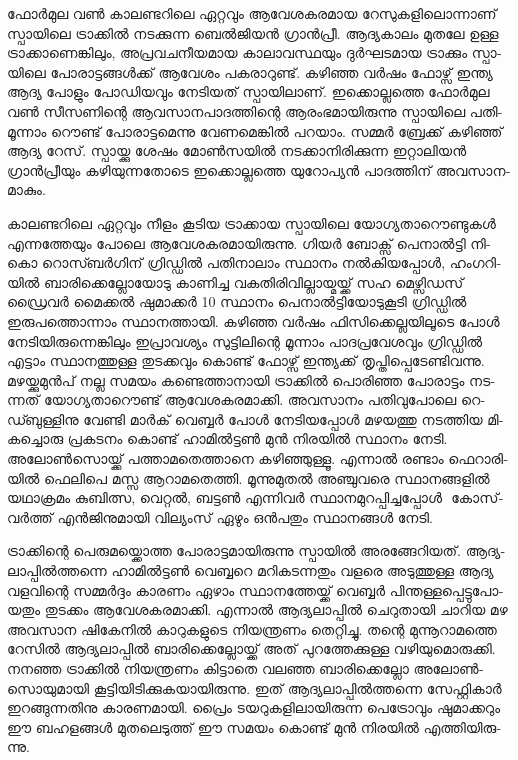 \vskip 2pt

ഫോര്‍­മുല വണ്‍ കാ­ല­ണ്ട­റി­ലെ ഏറ്റ­വും ആവേ­ശ­ക­ര­മായ റേ­സു­ക­ളി­ലൊ­ന്നാ­ണ് സ്പാ­യി­ലെ ട്രാ­ക്കില്‍ നട­ക്കു­ന്ന 
ബെല്‍­ജി­യന്‍ ഗ്രാന്‍­പ്രീ. ആദ്യ­കാ­ലം മു­ത­ലേ ഉള്ള ട്രാ­ക്കാ­ണെ­ങ്കി­ലും, അപ്ര­വ­ച­നീ­യ­മായ കാ­ലാ­വ­സ്ഥ­യും ദുര്‍­ഘ­ട­മായ 
ട്രാ­ക്കും സ്പാ­യി­ലെ പോ­രാ­ട്ട­ങ്ങള്‍­ക്ക് ആവേ­ശം പക­രാ­റു­ണ്ട്. കഴി­ഞ്ഞ വര്‍­ഷം ­ഫോ­ഴ്സ് ഇന്ത്യ ആദ്യ പോ­ളും പോ­ഡി­യ­വും 
നേ­ടി­യ­ത് സ്പാ­യി­ലാ­ണ്. ഇക്കൊ­ല്ല­ത്തെ ­ഫോര്‍­മുല വണ്‍ സീ­സ­ണി­ന്റെ ആവ­സാ­ന­പാ­ദ­ത്തി­ന്റെ ആരം­ഭ­മാ­യി­രു­ന്നു 
സ്പാ­യി­ലെ പതി­മൂ­ന്നാം റൌ­ണ്ട് പോ­രാ­ട്ട­മെ­ന്നു വേ­ണ­മെ­ങ്കില്‍ പറ­യാം. സമ്മര്‍ ബ്രേ­ക്ക് കഴി­ഞ്ഞ് ആദ്യ റേ­സ്. സ്പാ­യ്ക്കു 
ശേ­ഷം മോണ്‍­സ­യില്‍ നട­ക്കാ­നി­രി­ക്കു­ന്ന ഇറ്റാ­ലി­യന്‍ ഗ്രാന്‍­പ്രീ­യും കഴി­യു­ന്ന­തോ­ടെ ഇക്കൊ­ല്ല­ത്തെ യു­റോ­പ്യന്‍ 
പാ­ദ­ത്തി­ന് അവ­സാ­ന­മാ­കും­.

­കാ­ല­ണ്ട­റി­ലെ ഏറ്റ­വും നീ­ളം കൂ­ടിയ ട്രാ­ക്കായ സ്പാ­യി­ലെ യോ­ഗ്യ­താ­റൌ­ണ്ടു­കള്‍ എന്ന­ത്തേ­യും പോ­ലെ 
ആവേ­ശ­ക­ര­മാ­യി­രു­ന്നു. ഗി­യര്‍ ബോ­ക്സ് പെ­നാല്‍­ട്ടി നി­കൊ റൊ­സ്ബര്‍­ഗി­ന് ഗ്രി­ഡ്ഡില്‍ പതി­നാ­ലാം സ്ഥാ­നം 
നല്‍­കി­യ­പ്പോള്‍, ഹം­ഗ­റി­യില്‍ ബാ­രി­ക്കെ­ല്ലോ­യോ­ടു കാ­ണി­ച്ച വക­തി­രി­വി­ല്ലാ­യ്മ­യ്ക്ക് സഹ ­മെ­ഴ്സി­ഡ­സ് ഡ്രൈ­വര്‍ മൈ­ക്കല്‍ 
ഷു­മാ­ക്കര്‍ 10 സ്ഥാ­നം പെ­നാല്‍­ട്ടി­യോ­ടു­കൂ­ടി ഗ്രി­ഡ്ഡില്‍ ഇരുപത്തൊന്നാം സ്ഥാ­ന­ത്താ­യി. കഴി­ഞ്ഞ വര്‍­ഷം ഫി­സി­ക്കെ­ല്ല­യി­ലൂ­ടെ 
പോള്‍ നേ­ടി­യി­രു­ന്നെ­ങ്കി­ലും ഇപ്രാ­വ­ശ്യം സു­ട്ടി­ലി­ന്റെ മൂ­ന്നാം പാ­ദ­പ്ര­വേ­ശ­വും ഗ്രി­ഡ്ഡില്‍ എട്ടാം സ്ഥാ­ന­ത്തു­ള്ള തു­ട­ക്ക­വും 
കൊ­ണ്ട് ഫോ­ഴ്സ് ഇന്ത്യ­ക്ക് തൃ­പ്തി­പ്പെ­ടേ­ണ്ടി­വ­ന്നു. മഴ­യ്ക്കു­മുന്‍­പ് നല്ല സമ­യം കണ്ടെ­ത്താ­നാ­യി ട്രാ­ക്കില്‍ പൊ­രി­ഞ്ഞ പോ­രാ­ട്ടം 
നട­ന്ന­ത് യോ­ഗ്യ­താ­റൌ­ണ്ട് ആവേ­ശ­ക­ര­മാ­ക്കി. അവ­സാ­നം പതി­വു­പോ­ലെ റെ­ഡ്ബു­ള്ളി­നു വേ­ണ്ടി ­മാര്‍­ക് വെ­ബ്ബര്‍ 
പോള്‍ നേ­ടി­യ­പ്പോള്‍ മഴ­യ­ത്തു നട­ത്തിയ മി­ക­ച്ചൊ­രു പ്ര­ക­ട­നം കൊ­ണ്ട് ഹാ­മില്‍­ട്ടണ്‍ മുന്‍ നി­ര­യില്‍ സ്ഥാ­നം നേ­ടി. 
അലോണ്‍­സൊ­യ്ക്ക് പത്താ­മ­തെ­ത്താ­നെ കഴി­ഞ്ഞു­ള്ളൂ. എന്നാല്‍ രണ്ടാം ഫെ­റാ­രി­യില്‍ ­ഫെ­ലി­പെ മസ്സ ആറാ­മ­തെ­ത്തി. 
മൂ­ന്നു­മു­തല്‍ അഞ്ചു­വ­രെ സ്ഥാ­ന­ങ്ങ­ളില്‍ യഥാ­ക്ര­മം കു­ബി­ത്സ, വെ­റ്റല്‍, ബട്ടണ്‍ എന്നി­വര്‍ സ്ഥാ­ന­മു­റ­പ്പി­ച്ച­പ്പോള്‍ ­
കോ­സ്‌­വര്‍­ത്ത് എന്‍­ജി­നു­മാ­യി ­വി­ല്യം­സ് ഏഴും ഒന്‍­പ­തും സ്ഥാ­ന­ങ്ങള്‍ നേ­ടി­.

­ട്രാ­ക്കി­ന്റെ പെ­രു­മ­യ്ക്കൊ­ത്ത പോ­രാ­ട്ട­മാ­യി­രു­ന്നു സ്പാ­യില്‍ അര­ങ്ങേ­റി­യ­ത്. ആദ്യ­ലാ­പ്പില്‍­ത്ത­ന്നെ ഹാ­മില്‍­ട്ടണ്‍ വെ­ബ്ബ­റെ 
മറി­ക­ട­ന്ന­തും വള­രെ അടു­ത്തു­ള്ള ആദ്യ വള­വി­ന്റെ സമ്മര്‍­ദ്ദം കാ­ര­ണം ഏഴാം സ്ഥാ­ന­ത്തേ­യ്ക്ക് വെ­ബ്ബര്‍ 
പി­ന്ത­ള്ള­പ്പെ­ട്ടു­പോ­യ­തും തു­ട­ക്കം ആവേ­ശ­ക­ര­മാ­ക്കി. എന്നാല്‍ ആദ്യ­ലാ­പ്പില്‍ ചെ­റു­താ­യി ചാ­റിയ മഴ അവ­സാന 
ഷി­കേ­നില്‍ കാ­റു­ക­ളു­ടെ നി­യ­ന്ത്ര­ണം തെ­റ്റി­ച്ചു. തന്റെ മു­ന്നൂ­റാ­മ­ത്തെ റേ­സില്‍ ആദ്യ­ലാ­പ്പില്‍ ബാ­രി­ക്കെ­ല്ലോ­യ്ക്ക് അത് 
പു­റ­ത്തേ­ക്കു­ള്ള വഴി­യു­മൊ­രു­ക്കി. നന­ഞ്ഞ ട്രാ­ക്കില്‍ നി­യ­ന്ത്ര­ണം കി­ട്ടാ­തെ വല­ഞ്ഞ ­ബാ­രി­ക്കെ­ല്ലോ­ അലോണ്‍­സൊ­യു­മാ­യി 
കൂ­ട്ടി­യി­ടി­ക്കു­ക­യാ­യി­രു­ന്നു. ഇത് ആദ്യ­ലാ­പ്പില്‍­ത്ത­ന്നെ സേ­ഫ്റ്റി­കാര്‍ ഇറ­ങ്ങു­ന്ന­തി­നു കാ­ര­ണ­മാ­യി. പ്രൈം 
ടയ­റു­ക­ളി­ലാ­യി­രു­ന്ന പെ­ട്രോ­വും ഷു­മാ­ക്ക­റും ഈ ബഹ­ള­ങ്ങള്‍ മു­ത­ലെ­ടു­ത്ത് ഈ സമ­യം കൊ­ണ്ട് മുന്‍ നി­ര­യില്‍ 
എത്തി­യി­രു­ന്നു­.

